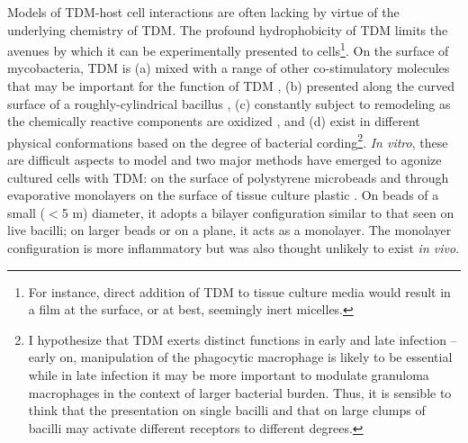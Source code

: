 Models of TDM-host cell interactions are often lacking by virtue of the underlying chemistry of TDM. The profound hydrophobicity of TDM limits the avenues by which it can be experimentally presented to cells\footnote{For instance, direct addition of TDM to tissue culture media would result in a film at the surface, or at best, seemingly inert micelles.}. On the surface of mycobacteria, TDM is (a) mixed with a range of other co-stimulatory molecules that may be important for the function of TDM \citep{Mazurek2012, Torrelles2010}, (b) presented along the curved surface of a roughly-cylindrical bacillus \citep{McCarter1935},  (c) constantly subject to remodeling as the chemically reactive components are oxidized \citep{Hett2010, Meniche2014, Shaku2020}, and (d) exist in different physical conformations based on the degree of bacterial cording\footnote{I hypothesize that TDM exerts distinct functions in early and late infection -- early on, manipulation of the phagocytic macrophage is likely to be essential while in late infection it may be more important to modulate granuloma macrophages in the context of larger bacterial burden. Thus, it is sensible to think that the presentation on single bacilli and that on large clumps of bacilli may activate different receptors to different degrees.}. \textit{In vitro}, these are difficult aspects to model and two major methods have emerged to agonize cultured cells with TDM: on the surface of polystyrene microbeads \citep{Bloch1950, Bowdish2009, Indrigo2003, Retzinger1982, Behling1993, Geisel2005} and through evaporative monolayers on the surface of tissue culture plastic \citep{Schabbing1994, Harland2008, Hunter2006a, Ishikawa2009, Zhao2014, Mikaye2013}. On beads of a small ($<$5 \textmu m) diameter, it adopts a bilayer configuration similar to that seen on live bacilli; on larger beads or on a plane, it acts as a monolayer. The monolayer configuration is more inflammatory but was also thought unlikely to exist \textit{in vivo}. 

